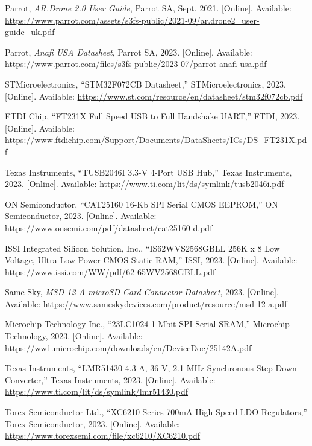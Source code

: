\documentclass[12pt]{article}
\begin{document}
\begin{thebibliography}{99}

Parrot, \emph{AR.Drone 2.0 User Guide}, Parrot SA, Sept. 2021. [Online]. Available: \url{https://www.parrot.com/assets/s3fs-public/2021-09/ar.drone2_user-guide_uk.pdf}

Parrot, \emph{Anafi USA Datasheet}, Parrot SA, 2023. [Online]. Available: \url{https://www.parrot.com/files/s3fs-public/2023-07/parrot-anafi-usa.pdf}

STMicroelectronics, ``STM32F072CB Datasheet,'' STMicroelectronics, 2023. [Online]. Available: \url{https://www.st.com/resource/en/datasheet/stm32f072cb.pdf}

FTDI Chip, ``FT231X Full Speed USB to Full Handshake UART,'' FTDI, 2023. [Online]. Available: \url{https://www.ftdichip.com/Support/Documents/DataSheets/ICs/DS_FT231X.pdf}

Texas Instruments, ``TUSB2046I 3.3-V 4-Port USB Hub,'' Texas Instruments, 2023. [Online]. Available: \url{https://www.ti.com/lit/ds/symlink/tusb2046i.pdf}

ON Semiconductor, ``CAT25160 16-Kb SPI Serial CMOS EEPROM,'' ON Semiconductor, 2023. [Online]. Available: \url{https://www.onsemi.com/pdf/datasheet/cat25160-d.pdf}

ISSI Integrated Silicon Solution, Inc., ``IS62WVS2568GBLL 256K x 8 Low Voltage, Ultra Low Power CMOS Static RAM,'' ISSI, 2023. [Online]. Available: \url{https://www.issi.com/WW/pdf/62-65WV2568GBLL.pdf}

Same Sky, \emph{MSD-12-A microSD Card Connector Datasheet}, 2023. [Online]. Available: \url{https://www.sameskydevices.com/product/resource/msd-12-a.pdf}

Microchip Technology Inc., ``23LC1024 1 Mbit SPI Serial SRAM,'' Microchip Technology, 2023. [Online]. Available: \url{https://ww1.microchip.com/downloads/en/DeviceDoc/25142A.pdf}

Texas Instruments, ``LMR51430 4.3-A, 36-V, 2.1-MHz Synchronous Step-Down Converter,'' Texas Instruments, 2023. [Online]. Available: \url{https://www.ti.com/lit/ds/symlink/lmr51430.pdf}

Torex Semiconductor Ltd., ``XC6210 Series 700mA High-Speed LDO Regulators,'' Torex Semiconductor, 2023. [Online]. Available: \url{https://www.torexsemi.com/file/xc6210/XC6210.pdf}


\end{thebibliography}
\end{document}
